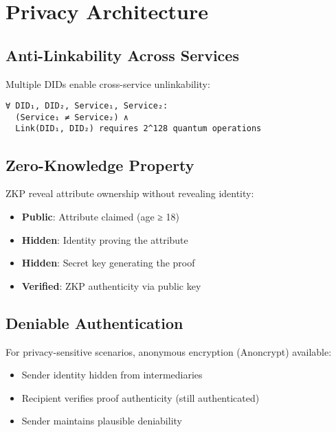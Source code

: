 \chapter{Privacy Architecture}

\section{Anti-Linkability Across Services}

Multiple DIDs enable cross-service unlinkability:

\begin{verbatim}
∀ DID₁, DID₂, Service₁, Service₂:
  (Service₁ ≠ Service₂) ∧
  Link(DID₁, DID₂) requires 2^128 quantum operations
\end{verbatim}

\section{Zero-Knowledge Property}

ZKP reveal attribute ownership without revealing identity:

\begin{itemize}
  \item \textbf{Public}: Attribute claimed (age ≥ 18)
  \item \textbf{Hidden}: Identity proving the attribute
  \item \textbf{Hidden}: Secret key generating the proof
  \item \textbf{Verified}: ZKP authenticity via public key
\end{itemize}

\section{Deniable Authentication}

For privacy-sensitive scenarios, anonymous encryption (Anoncrypt) available:

\begin{itemize}
  \item Sender identity hidden from intermediaries
  \item Recipient verifies proof authenticity (still authenticated)
  \item Sender maintains plausible deniability
\end{itemize}

